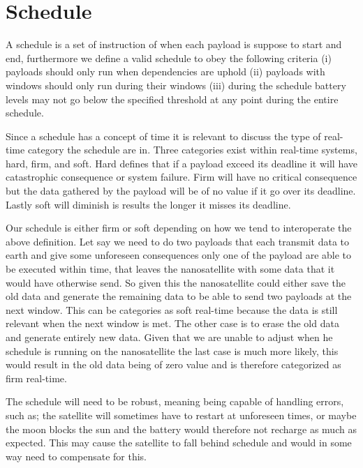 \section{Schedule} \label{sec:schedule}
A schedule is a set of instruction of when each payload is suppose to start and end, furthermore we define a valid schedule to obey the following criteria (i) payloads should only run when dependencies are uphold (ii) payloads with windows should only run during their windows (iii) during the schedule battery levels may not go below the specified threshold at any point during the entire schedule.

Since a schedule has a concept of time it is relevant to discuss the type of real-time category the schedule are in.
Three categories exist within real-time systems, hard, firm, and soft. Hard defines that if a payload exceed its deadline it will have catastrophic consequence or system failure. Firm will have no critical consequence but the data gathered by the payload will be of no value if it go over its deadline. Lastly soft will diminish is results the longer it misses its deadline\cite{real_time_computing}. 

Our schedule is either firm or soft depending on how we tend to interoperate the above definition. Let say we need to do two payloads that each transmit data to earth and give some unforeseen consequences only one of the payload are able to be executed within time, that leaves the nanosatellite with some data that it would have otherwise send. So given this the nanosatellite could either save the old data and generate the remaining data to be able to send two payloads at the next window. This can be categories as soft real-time because the data is still relevant when the next window is met. The other case is to erase the old data and generate entirely new data. Given that we are unable to adjust when he schedule is running on the nanosatellite the last case is much more likely, this would result in the old data being of zero value and is therefore categorized as firm real-time.  

The schedule will need to be robust, meaning being capable of handling errors, such as; the satellite will sometimes have to restart at unforeseen times, or maybe the moon blocks the sun and the battery would therefore not recharge as much as expected. This may cause the satellite to fall behind schedule and would in some way need to compensate for this.

